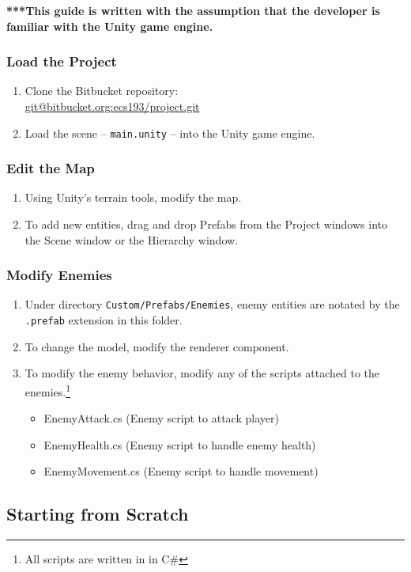 \documentclass[a4paper]{refart}
\begin{document}
\textbf{***This guide is written with the assumption that the developer is familiar with the Unity game engine.}

\subsubsection{Load the Project}

\begin{enumerate}
	\item Clone the Bitbucket repository:\\ \url{git@bitbucket.org:ecs193/project.git}
	\item Load the scene -- \texttt{main.unity} -- into the Unity game engine.
\end{enumerate}

\subsubsection{Edit the Map}

\begin{enumerate}
	\item Using Unity's terrain tools, modify the map.
	\item To add new entities, drag and drop Prefabs from the Project windows into the Scene window or the Hierarchy window.
\end{enumerate}

\subsubsection{Modify Enemies}

\begin{enumerate}
	\item Under directory \texttt{Custom/Prefabs/Enemies}, enemy entities are notated by the \texttt{.prefab} extension in this folder.
	\item To change the model, modify the renderer component.
	\item To modify the enemy behavior, modify any of the scripts attached to the enemies.\footnote{All scripts are written in in C\#}
	\begin{itemize}
		\item EnemyAttack.cs (Enemy script to attack player)
		\item EnemyHealth.cs (Enemy script to handle enemy health)
		\item EnemyMovement.cs (Enemy script to handle movement)
	\end{itemize}
\end{enumerate}

\subsection{Starting from Scratch}
\end{document}
